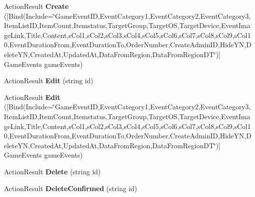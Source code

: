 \begin{DoxyCompactItemize}
\item 
Action\+Result {\bfseries Create} (\mbox{[}Bind(Include=\char`\"{}Game\+Event\+ID,Event\+Category1,Event\+Category2,Event\+Category3,Item\+List\+ID,Item\+Count,Itemstatus,Target\+Group,Target\+OS,Target\+Device,Event\+Image\+Link,Title,Content,s\+Col1,s\+Col2,s\+Col3,s\+Col4,s\+Col5,s\+Col6,s\+Col7,s\+Col8,s\+Col9,s\+Col10,Event\+Duration\+From,Event\+Duration\+To,Order\+Number,Create\+Admin\+ID,Hide\+YN,Delete\+YN,Created\+At,Updated\+At,Data\+From\+Region,Data\+From\+Region\+DT\char`\"{})\mbox{]} Game\+Events game\+Events)\hypertarget{class_cloud_bread_admin_web_1_1_controllers_1_1_game_events_controller_ac76e75b14047bcdb69cc784cbdfa5993}{}\label{class_cloud_bread_admin_web_1_1_controllers_1_1_game_events_controller_ac76e75b14047bcdb69cc784cbdfa5993}

\item 
Action\+Result {\bfseries Edit} (string id)\hypertarget{class_cloud_bread_admin_web_1_1_controllers_1_1_game_events_controller_a0b743baa7e1c50e34095856eb2eea3a9}{}\label{class_cloud_bread_admin_web_1_1_controllers_1_1_game_events_controller_a0b743baa7e1c50e34095856eb2eea3a9}

\item 
Action\+Result {\bfseries Edit} (\mbox{[}Bind(Include=\char`\"{}Game\+Event\+ID,Event\+Category1,Event\+Category2,Event\+Category3,Item\+List\+ID,Item\+Count,Itemstatus,Target\+Group,Target\+OS,Target\+Device,Event\+Image\+Link,Title,Content,s\+Col1,s\+Col2,s\+Col3,s\+Col4,s\+Col5,s\+Col6,s\+Col7,s\+Col8,s\+Col9,s\+Col10,Event\+Duration\+From,Event\+Duration\+To,Order\+Number,Create\+Admin\+ID,Hide\+YN,Delete\+YN,Created\+At,Updated\+At,Data\+From\+Region,Data\+From\+Region\+DT\char`\"{})\mbox{]} Game\+Events game\+Events)\hypertarget{class_cloud_bread_admin_web_1_1_controllers_1_1_game_events_controller_a8cf4442b12f5ca4f9d04d68d82a530d7}{}\label{class_cloud_bread_admin_web_1_1_controllers_1_1_game_events_controller_a8cf4442b12f5ca4f9d04d68d82a530d7}

\item 
Action\+Result {\bfseries Delete} (string id)\hypertarget{class_cloud_bread_admin_web_1_1_controllers_1_1_game_events_controller_a38e12ff4ecb98405ed9544bdc413aee0}{}\label{class_cloud_bread_admin_web_1_1_controllers_1_1_game_events_controller_a38e12ff4ecb98405ed9544bdc413aee0}

\item 
Action\+Result {\bfseries Delete\+Confirmed} (string id)\hypertarget{class_cloud_bread_admin_web_1_1_controllers_1_1_game_events_controller_a6d8873e561d1d02453ae2e6859e46692}{}\label{class_cloud_bread_admin_web_1_1_controllers_1_1_game_events_controller_a6d8873e561d1d02453ae2e6859e46692}

\end{DoxyCompactItemize}
